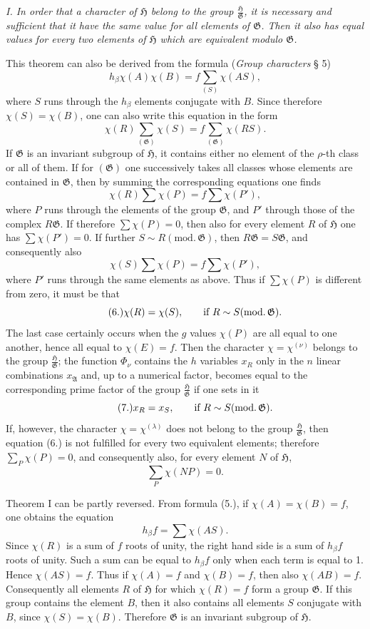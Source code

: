 \documentclass[11pt]{article}
\newcommand{\Hgr}{\mathfrak{H}}
\newcommand{\Ggr}{\mathfrak{G}}
\begin{document}
\emph{I. In order that a character of $\Hgr$ belong to the group $\frac{\Hgr}{\Ggr}$, it is necessary and sufficient that it have the same value for all elements of $\Ggr$. Then it also has equal values for every two elements of $\Hgr$ which are equivalent modulo $\Ggr$.}

This theorem can also be derived from the formula (\emph{Group characters} § 5)
\[
\tag{5.}
  h_\beta\chi(A)\chi(B)=f\sum_{(S)}\chi(AS),
\]
where $S$ runs through the $h_\beta$ elements conjugate with $B$. Since therefore $\chi(S)=\chi(B)$, one can also write this equation in the form
\[
  \chi(R)\sum_{(\Ggr)}\chi(S)=f\sum_{(\Ggr)}\chi(RS).
\]
If $\Ggr$ is an invariant subgroup of $\Hgr$, it contains either no element of the $\rho$-th class or all of them. If for $(\Ggr)$ one successively takes all classes whose elements are contained in $\Ggr$, then by summing the corresponding equations one finds
\[
  \chi(R)\sum\chi(P)=f\sum\chi(P'),
\]
where $P$ runs through the elements of the group $\Ggr$, and $P'$ through those of the complex $R\Ggr$. If therefore $\sum\chi(P)=0$, then also for every element $R$ of $\Hgr$ one has $\sum\chi(P')=0$. If further $S\sim R(\mathrm{mod.}\,\Ggr)$, then $R\Ggr=S\Ggr$, and consequently also
\[
  \chi(S)\sum\chi(P)=f\sum\chi(P'),
\]
where $P'$ runs through the same elements as above. Thus if $\sum\chi(P)$ is different from zero, it must be that
\[
\tag{6.}
  \chi(R)=\chi(S),\qquad \hbox{if } R\sim S(\mathrm{mod.}\,\Ggr).
\]
The last case certainly occurs when the $g$ values $\chi(P)$ are all equal to one another, hence all equal to $\chi(E)=f$. Then the character $\chi=\chi^{(\nu)}$ belongs to the group $\frac{\Hgr}{\Ggr}$; the function $\Phi_\nu$ contains the $h$ variables $x_R$ only in the $n$ linear combinations $x_{\mathfrak A}$ and, up to a numerical factor, becomes equal to the corresponding prime factor of the group $\frac{\Hgr}{\Ggr}$ if one sets in it
\[
\tag{7.}
  x_R=x_S,\qquad \hbox{if } R\sim S(\mathrm{mod.}\,\Ggr).
\]
If, however, the character $\chi=\chi^{(\lambda)}$ does not belong to the group $\frac{\Hgr}{\Ggr}$, then equation (6.) is not fulfilled for every two equivalent elements; therefore $\sum_P\chi(P)=0$, and consequently also, for every element $N$ of $\Hgr$,
\[
\tag{8.}
  \sum_P\chi(NP)=0.
\]

Theorem I can be partly reversed. From formula (5.), if $\chi(A)=\chi(B)=f$, one obtains the equation
\[
  h_\beta f=\sum\chi(AS).
\]
Since $\chi(R)$ is a sum of $f$ roots of unity, the right hand side is a sum of $h_\beta f$ roots of unity. Such a sum can be equal to $h_\beta f$ only when each term is equal to 1. Hence $\chi(AS)=f$. Thus if $\chi(A)=f$ and $\chi(B)=f$, then also $\chi(AB)=f$. Consequently all elements $R$ of $\Hgr$ for which $\chi(R)=f$ form a group $\Ggr$. If this group contains the element $B$, then it also contains all elements $S$ conjugate with $B$, since $\chi(S)=\chi(B)$. Therefore $\Ggr$ is an invariant subgroup of $\Hgr$.
\end{document}
